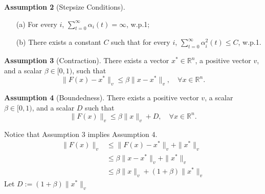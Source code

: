 \vspace{1em}

\noindent
\textbf{Assumption 2} (Stepsize Conditions).
\begin{enumerate}
\item[(a)] For every $i$, $\sum_{t=0}^{\infty} \alpha_i(t) = \infty$, w.p.1;
\item[(b)] There exists a constant $C$ such that for every $i$, $\sum_{t=0}^{\infty} \alpha_i^2(t) \leq C$, w.p.1.
\end{enumerate}

\vspace{1em}

\noindent
\textbf{Assumption 3} (Contraction).
There exists a vector $x^* \in \mathbb{R}^n$, a positive vector $v$, and a scalar $\beta \in [0,1)$, such that
\begin{equation}
\|F(x) - x^*\|_v \leq \beta \|x - x^*\|_v, \quad \forall x \in \mathbb{R}^n.
\end{equation}

\vspace{1em}

\noindent
\textbf{Assumption 4} (Boundedness).
There exists a positive vector $v$, a scalar $\beta \in [0,1)$, and a scalar $D$ such that
\begin{equation}
\|F(x)\|_v \leq \beta\|x\|_v + D, \quad \forall x \in \mathbb{R}^n.
\end{equation}
\begin{remark}\label{rm:3implies4}
    Notice that Assumption 3 implies Assumption 4.
        \begin{align*}
        \|F(x)\|_v &\le \|F(x)-x^*\|_v + \|x^*\|_v\tag{$\Delta$ ineq.}\\
        &\le \beta \|x-x^*\|_v+\|x^*\|_v\tag{Assumption 3}\\
        &\le \beta\|x\|_v + (1+\beta) \|x^*\|_v\tag{$\Delta$ ineq.}
    \end{align*}
    Let $D:= (1+\beta)\|x^*\|_v$
\end{remark}

